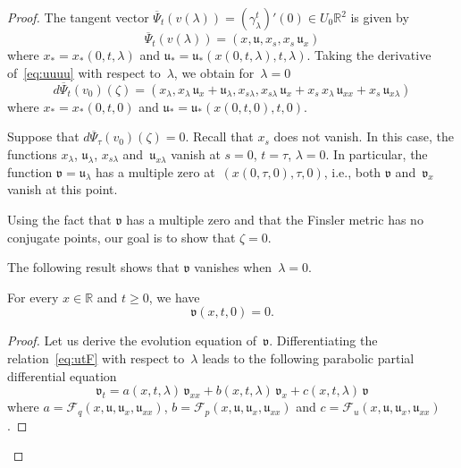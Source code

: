 \documentclass[AHL,Unicode,longabstracts,published]{cedram}
\newcommand{\FF}{\mathcal{F}}
\newcommand{\R}{\mathbb{R}}
\newcommand{\bu}{\mathfrak{u}}
\newcommand{\bv}{\mathfrak{v}}
\newcommand{\ie}{i.e.}
\begin{document}
\begin{proof}

The tangent vector $\overline{\Psi}_t(v(\lambda)) = (\gamma_{\lambda}^t)'(0) \in U_0 \R^2$ is given by
\begin{equation}\label{eq:uuuu}
\overline{\Psi}_t(v(\lambda)) =
\left(x,\bu,x_s,x_s \, \bu_x \right)
\end{equation}
where $x_*=x_*(0,t,\lambda)$ and $\bu_*=\bu_*(x(0,t,\lambda),t,\lambda)$. Taking the derivative of~\eqref{eq:uuuu} with respect to~$\lambda$, we obtain for~$\lambda=0$
\begin{equation}\label{eq:dPsi}
d\overline{\Psi}_t(v_0)(\zeta) = \left(x_\lambda, x_\lambda \, \bu_x + \bu_\lambda, x_{s \lambda}, x_{s \lambda} \, \bu_x + x_s \, x_\lambda \, \bu_{xx} + x_s \, \bu_{x \lambda} \right)
\end{equation}
where $x_* = x_*(0,t,0)$ and $\bu_* = \bu_*(x(0,t,0),t,0)$. 


Suppose that $d\overline{\Psi}_\tau(v_0)(\zeta)=0$. Recall that $x_s$ does not vanish. In this case, the functions $x_\lambda$, $\bu_\lambda$, $x_{s \lambda}$ and~$\bu_{x \lambda}$ vanish at $s=0$, $t=\tau$, $\lambda=0$.
In particular, the function $\bv=\bu_\lambda$ has a multiple zero at~$(x(0,\tau,0),\tau,0)$, \ie, both $\bv$ and~$\bv_x$ vanish at this point.

Using the fact that $\bv$ has a multiple zero and that the Finsler metric has no conjugate points, our goal is to show that $\zeta=0$. 

The following result shows that $\bv$ vanishes when~$\lambda=0$.

\begin{lemm}\label{lem:v}
For every $x \in \R$ and $t \geq 0$, we have
\[
\bv(x,t,0)=0.
\]
\end{lemm}

\begin{proof}
Let us derive the evolution equation of~$\bv$. Differentiating the relation~\eqref{eq:utF} with respect to~$\lambda$ leads to the following parabolic partial differential equation
\begin{equation}\label{eq:vt}
\bv_t = a(x,t,\lambda) \, \bv_{xx} + b(x,t,\lambda) \, \bv_x + c(x,t,\lambda) \, \bv
\end{equation}
where $a=\FF_q(x,\bu,\bu_x,\bu_{xx})$, $b=\FF_p(x,\bu,\bu_x,\bu_{xx})$ and $c=\FF_u(x,\bu,\bu_x,\bu_{xx})$.


\end{proof}
\end{proof}
\end{document}
